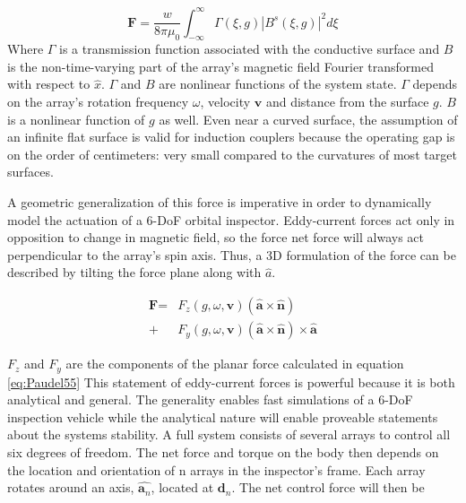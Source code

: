 \documentclass[letterpaper, 10 pt, conference]{ieeeconf}  %
\begin{document}
\begin{equation}
\label{eq:Paudel55}
\textbf{F} = \frac{w}{8\pi\mu_0} \int^{\infty}_{-\infty}\Gamma(\xi,g)|B^s(\xi,g)|^2 d\xi
\end{equation}
Where $\Gamma$ is a transmission function associated with the conductive surface and $B$ is the non-time-varying part of the array's magnetic field Fourier transformed with respect to $\hat{x}$.
% 
 $\Gamma$ and $B$ are nonlinear functions of the system state. $\Gamma$ depends on the array's rotation frequency $\omega$, velocity $\textbf{v}$ and distance from the surface $g$. $B$ is a nonlinear function of $g$ as well. Even near a curved surface, the assumption of an infinite flat surface is valid for induction couplers because the operating gap is on the order of centimeters: very small compared to the curvatures of most target surfaces. 
 
A geometric generalization of this force is imperative in order to dynamically model the actuation of a 6-DoF orbital inspector. Eddy-current forces act only in opposition to change in magnetic field, so the force net force will always act perpendicular to the array's spin axis. Thus, a 3D formulation of the force can be described by tilting the force plane along with $\hat{a}$. 


\begin{equation}
\label{eq:arrayForce}
\begin{split}
\textbf{F} =  &F_z(g,\omega,\textbf{v}) \left(\hat{\textbf{a}} \times \hat{\textbf{n}} \right) \\
			 + &F_y(g,\omega,\textbf{v}) \left(\hat{\textbf{a}} \times \hat{\textbf{n}} \right) \times \hat{\textbf{a}}
 \end{split}
 \end{equation}
 
 $F_z$ and $F_y$ are the components of the planar force calculated in equation \ref{eq:Paudel55}
 This statement of eddy-current forces is powerful because it is both analytical and general. The generality enables fast simulations of a 6-DoF inspection vehicle while the analytical nature will enable proveable statements about the systems stability.
A full system consists of several arrays to control all six degrees of freedom. The net force and torque on the body then depends on the location and orientation of n arrays in the inspector's frame. Each array rotates around an axis, $\hat{\textbf{a}_n}$, located at $\textbf{d}_n$. The net control force will then be 
 
\end{document}

